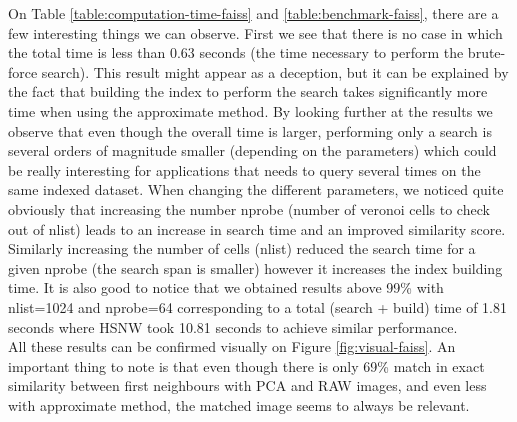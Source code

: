 \documentclass[a4paper]{article}
\begin{document}
On Table \ref{table:computation-time-faiss} and \ref{table:benchmark-faiss}, there are a few interesting things we can observe. First we see that there is no case in which the total time is less than 0.63 seconds (the time necessary to perform the brute-force search). This result might appear as a deception, but it can be explained by the fact that building the index to perform the search takes significantly more time when using the approximate method. By looking further at the results we observe that even though the overall time is larger, performing only a search is several orders of magnitude smaller (depending on the parameters) which could be really interesting for applications that needs to query several times on the same indexed dataset. When changing the different parameters, we noticed quite obviously that increasing the number nprobe (number of veronoi cells to check out of nlist) leads to an increase in search time and an improved similarity score. Similarly increasing the number of cells (nlist) reduced the search time for a given nprobe (the search span is smaller) however it increases the index building time. It is also good to notice that we obtained results above 99\% with nlist=1024 and nprobe=64 corresponding to a total (search + build) time of 1.81 seconds where HSNW took 10.81 seconds to achieve similar performance. \\

All these results can be confirmed visually on Figure \ref{fig:visual-faiss}. An important thing to note is that even though there is only 69\% match in exact similarity between first neighbours with PCA and RAW images, and even less with approximate method, the matched image seems to always be relevant. \\
\end{document}

